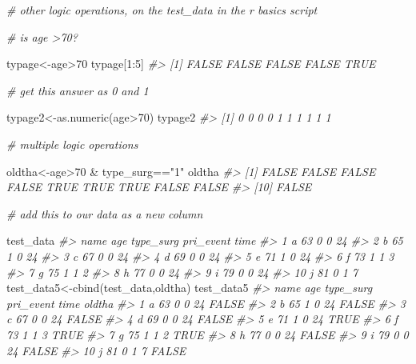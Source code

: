 \documentclass[
]{book}
\newenvironment{Shaded}{\begin{snugshade}}{\end{snugshade}}
\newcommand{\CommentTok}[1]{\textcolor[rgb]{0.56,0.35,0.01}{\textit{#1}}}
\newcommand{\DecValTok}[1]{\textcolor[rgb]{0.00,0.00,0.81}{#1}}
\newcommand{\FunctionTok}[1]{\textcolor[rgb]{0.00,0.00,0.00}{#1}}
\newcommand{\NormalTok}[1]{#1}
\newcommand{\OtherTok}[1]{\textcolor[rgb]{0.56,0.35,0.01}{#1}}
\newcommand{\SpecialCharTok}[1]{\textcolor[rgb]{0.00,0.00,0.00}{#1}}
\newcommand{\StringTok}[1]{\textcolor[rgb]{0.31,0.60,0.02}{#1}}
\begin{document}
\begin{Shaded}
\begin{Highlighting}[]
\CommentTok{\# other logic operations, on the test\_data in the r basics script}

\CommentTok{\# is age \textgreater{}70?}

\NormalTok{typage}\OtherTok{\textless{}{-}}\NormalTok{age}\SpecialCharTok{\textgreater{}}\DecValTok{70}
\NormalTok{typage[}\DecValTok{1}\SpecialCharTok{:}\DecValTok{5}\NormalTok{]}
\CommentTok{\#\textgreater{} [1] FALSE FALSE FALSE FALSE  TRUE}

\CommentTok{\# get this answer as 0 and 1}

\NormalTok{typage2}\OtherTok{\textless{}{-}}\FunctionTok{as.numeric}\NormalTok{(age}\SpecialCharTok{\textgreater{}}\DecValTok{70}\NormalTok{)}
\NormalTok{typage2  }
\CommentTok{\#\textgreater{}  [1] 0 0 0 0 1 1 1 1 1 1}

\CommentTok{\# multiple logic operations}

\NormalTok{oldtha}\OtherTok{\textless{}{-}}\NormalTok{age}\SpecialCharTok{\textgreater{}}\DecValTok{70} \SpecialCharTok{\&}\NormalTok{ type\_surg}\SpecialCharTok{==}\StringTok{"1"}
\NormalTok{oldtha}
\CommentTok{\#\textgreater{}  [1] FALSE FALSE FALSE FALSE  TRUE  TRUE  TRUE FALSE FALSE}
\CommentTok{\#\textgreater{} [10] FALSE}

\CommentTok{\# add this to our data as a new column}

\NormalTok{test\_data}
\CommentTok{\#\textgreater{}    name age type\_surg pri\_event time}
\CommentTok{\#\textgreater{} 1     a  63         0         0   24}
\CommentTok{\#\textgreater{} 2     b  65         1         0   24}
\CommentTok{\#\textgreater{} 3     c  67         0         0   24}
\CommentTok{\#\textgreater{} 4     d  69         0         0   24}
\CommentTok{\#\textgreater{} 5     e  71         1         0   24}
\CommentTok{\#\textgreater{} 6     f  73         1         1    3}
\CommentTok{\#\textgreater{} 7     g  75         1         1    2}
\CommentTok{\#\textgreater{} 8     h  77         0         0   24}
\CommentTok{\#\textgreater{} 9     i  79         0         0   24}
\CommentTok{\#\textgreater{} 10    j  81         0         1    7}
\NormalTok{test\_data5}\OtherTok{\textless{}{-}}\FunctionTok{cbind}\NormalTok{(test\_data,oldtha)}
\NormalTok{test\_data5}
\CommentTok{\#\textgreater{}    name age type\_surg pri\_event time oldtha}
\CommentTok{\#\textgreater{} 1     a  63         0         0   24  FALSE}
\CommentTok{\#\textgreater{} 2     b  65         1         0   24  FALSE}
\CommentTok{\#\textgreater{} 3     c  67         0         0   24  FALSE}
\CommentTok{\#\textgreater{} 4     d  69         0         0   24  FALSE}
\CommentTok{\#\textgreater{} 5     e  71         1         0   24   TRUE}
\CommentTok{\#\textgreater{} 6     f  73         1         1    3   TRUE}
\CommentTok{\#\textgreater{} 7     g  75         1         1    2   TRUE}
\CommentTok{\#\textgreater{} 8     h  77         0         0   24  FALSE}
\CommentTok{\#\textgreater{} 9     i  79         0         0   24  FALSE}
\CommentTok{\#\textgreater{} 10    j  81         0         1    7  FALSE}


\end{Highlighting}
\end{Shaded}
\end{document}
